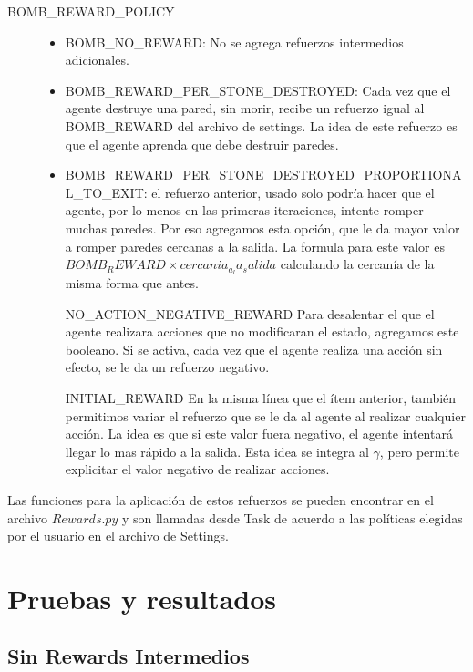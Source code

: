 \documentclass[a4paper,spanish] {article}
\begin{document}
\begin{description}
\item[BOMB_REWARD_POLICY] 
	\begin{itemize}
	\item BOMB_NO_REWARD: No se agrega refuerzos intermedios adicionales.
	\item BOMB_REWARD_PER_STONE_DESTROYED: Cada vez que el agente destruye una pared, sin morir, recibe un refuerzo igual al BOMB_REWARD del archivo de settings. La idea de este refuerzo es que el agente aprenda que debe destruir paredes.
	\item BOMB_REWARD_PER_STONE_DESTROYED_PROPORTIONAL_TO_EXIT: el refuerzo anterior, usado solo podr\'ia hacer que el agente, por lo menos en las primeras iteraciones, intente romper muchas paredes. Por eso agregamos esta opci\'on, que le da mayor valor a romper paredes cercanas a la salida. La formula para este valor es $BOMB_REWARD \times cercania_a_la_salida$ calculando la cercan\'ia de la misma forma que antes.
	
\item[NO_ACTION_NEGATIVE_REWARD] Para desalentar el que el agente realizara acciones que no modificaran el estado, agregamos este booleano. Si se activa, cada vez que el agente realiza una acci\'on sin efecto, se le da un refuerzo negativo. 

\item[INITIAL_REWARD] En la misma l\'inea que el \'item anterior, tambi\'en permitimos variar el refuerzo que se le da al agente al realizar cualquier acci\'on. La idea es que si este valor fuera negativo, el agente intentar\'a llegar lo mas r\'apido a la salida. Esta idea se integra al $\gamma$, pero permite explicitar el valor negativo de realizar acciones.

	\end{itemize}

\end{description}

	Las funciones para la aplicaci\'on de estos refuerzos se pueden encontrar en el archivo $Rewards.py$ y son llamadas desde Task de acuerdo a las pol\'iticas elegidas por el usuario en el archivo de Settings.
 
\section{Pruebas y resultados}
	\subsection{Sin Rewards Intermedios}
\end{document}
